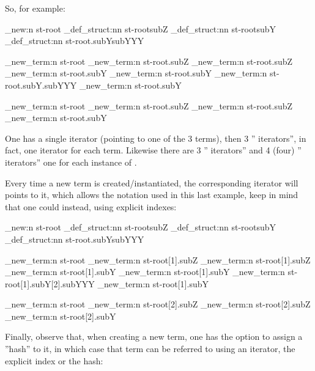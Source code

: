 \documentclass[10pt]{article}
\begin{document}
So, for example:
\begin{codestore}[store-env=demo4]
\starray_new:n {st-root}
\starray_def_struct:nn {st-root}{subZ}
\starray_def_struct:nn {st-root}{subY}
\starray_def_struct:nn {st-root.subY}{subYYY}

\starray_new_term:n {st-root}
\starray_new_term:n {st-root.subZ}
\starray_new_term:n {st-root.subZ}
\starray_new_term:n {st-root.subY}
\starray_new_term:n {st-root.subY}
\starray_new_term:n {st-root.subY.subYYY}
\starray_new_term:n {st-root.subY}

\starray_new_term:n {st-root}
\starray_new_term:n {st-root.subZ}
\starray_new_term:n {st-root.subZ}
\starray_new_term:n {st-root.subY}
\end{codestore}


One has a single  iterator (pointing to one of the 3  terms), then 3 '' iterators'', in fact, one  iterator for each  term.
Likewise there are 3 '' iterators'' and 4 (four) '' iterators'' one for each instance of .

Every time a new term is created/instantiated, the corresponding iterator will points to it, which allows the notation used in this last example, keep in mind that one could instead, using explicit indexes:

\begin{codestore}[store-env=demo5]
\starray_new:n {st-root}
\starray_def_struct:nn {st-root}{subZ}
\starray_def_struct:nn {st-root}{subY}
\starray_def_struct:nn {st-root.subY}{subYYY}

\starray_new_term:n {st-root}
\starray_new_term:n {st-root[1].subZ}
\starray_new_term:n {st-root[1].subZ}
\starray_new_term:n {st-root[1].subY}
\starray_new_term:n {st-root[1].subY}
\starray_new_term:n {st-root[1].subY[2].subYYY}
\starray_new_term:n {st-root[1].subY}

\starray_new_term:n {st-root}
\starray_new_term:n {st-root[2].subZ}
\starray_new_term:n {st-root[2].subZ}
\starray_new_term:n {st-root[2].subY}
\end{codestore}


Finally, observe that, when creating a new term, one has the option to assign a ''hash'' to it, in which case that term can be referred to using an iterator, the explicit index or the hash:
\end{document}
